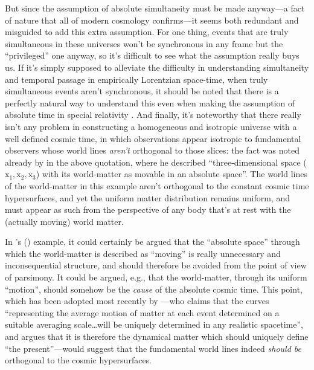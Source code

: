 \documentclass[12 pt]{article}
\def\citeapos#1{\citeauthor{#1}'s (\citeyear{#1})}
\begin{document}
But since the assumption of absolute simultaneity must be made anyway---a fact of nature that all of modern cosmology confirms---it seems both redundant and misguided to add this extra assumption. For one thing, events that are truly simultaneous in these universes won't be synchronous in any frame but the ``privileged'' one anyway, so it's difficult to see what the assumption really buys us. If it's simply supposed to alleviate the difficulty in understanding simultaneity and temporal passage in empirically Lorentzian space-time, when truly simultaneous events aren't synchronous, it should be noted that there is a perfectly natural way to understand this even when making the assumption of absolute time in special relativity \citep{Janzen2012b,Janzen2013}. And finally, it's noteworthy that there really isn't any problem in constructing a homogeneous and isotropic universe with a well defined cosmic time, in which observations appear isotropic to fundamental observers whose world lines \textit{aren't} orthogonal to those slices: the fact was noted already by \citet{deSitter1917b} in the above quotation, where he described ``three-dimensional space ($\mathrm{x}_1, \mathrm{x}_2, \mathrm{x}_3$) with its world-matter as movable in an absolute space''. The world lines of the world-matter in this example aren't orthogonal to the constant cosmic time hypersurfaces, and yet the uniform matter distribution remains uniform, and must appear as such from the perspective of any body that's at rest with the (actually moving) world matter.

In \citeapos{deSitter1917b} example, it could certainly be argued that the ``absolute space'' through which the world-matter is described as ``moving'' is really unnecessary and inconsequential structure, and should therefore be avoided from the point of view of parsimony. It could be argued, e.g., that the world-matter, through its uniform ``motion'', should somehow be the \textit{cause} of the absolute cosmic time. This point, which has been adopted most recently by \citet{Ellis2013}---who claims that the curves ``representing the average motion of matter at each event determined on a suitable averaging scale\ldots will be uniquely determined in any realistic spacetime'', and argues that it is therefore the dynamical matter which should uniquely define ``the present''---would suggest that the fundamental world lines indeed \textit{should be} orthogonal to the cosmic hypersurfaces.
\end{document}
